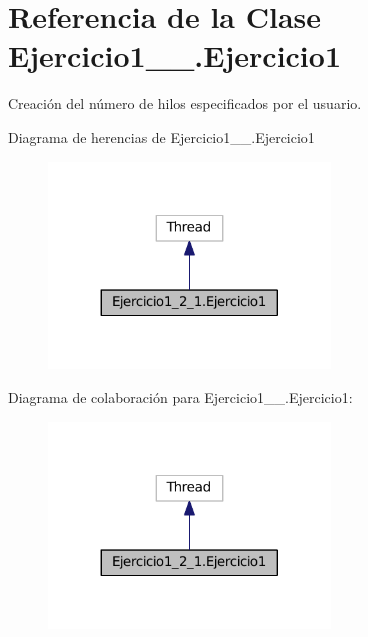 \hypertarget{class_ejercicio1__2__1_1_1_ejercicio1}{}\section{Referencia de la Clase Ejercicio1\+\_\+\_.\+Ejercicio1}
\label{class_ejercicio1__2__1_1_1_ejercicio1}


Creación del número de hilos especificados por el usuario.  




Diagrama de herencias de Ejercicio1\+\_\+\_.\+Ejercicio1
\nopagebreak
\begin{figure}[H]
\begin{center}
\leavevmode
\includegraphics[width=212pt]{class_ejercicio1__2__1_1_1_ejercicio1__inherit__graph}
\end{center}
\end{figure}


Diagrama de colaboración para Ejercicio1\+\_\+\_.\+Ejercicio1\+:
\nopagebreak
\begin{figure}[H]
\begin{center}
\leavevmode
\includegraphics[width=212pt]{class_ejercicio1__2__1_1_1_ejercicio1__coll__graph}
\end{center}
\end{figure}
